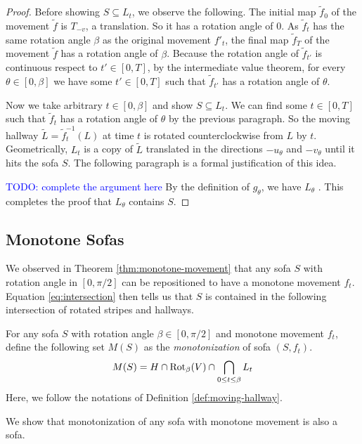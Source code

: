 \begin{proof}
Before showing $S \subseteq L_t$, we observe the following. The initial map $\tilde{f}_0$ of the movement $\tilde{f}$ is
$T_{-v}$, a translation. 
So it has a rotation angle of $0$.
As $\tilde{f}_t$ has the same rotation angle $\beta$ as the original movement $f'_t$, the final map $\tilde{f}_T$ of the movement $\tilde{f}$ has a rotation angle of $\beta$.
Because the rotation angle of $\tilde{f}_{t'}$ is continuous respect to $t' \in [0, T]$,
by the intermediate value theorem, for every $\theta \in [0, \beta]$ we have
some $t' \in [0, T]$ such that $\tilde{f}_{t'}$ has a rotation angle of $\theta$.

Now we take arbitrary $t \in [0, \beta]$ and show $S \subseteq L_t$.
We can find some $t \in [0, T]$ such that $\tilde{f}_t$ has a rotation angle of $\theta$ by the previous paragraph.
So the moving hallway $\tilde{L} = \tilde{f}_t^{-1}(L)$ at time $t$ is rotated counterclockwise from $L$ by $t$.
Geometrically, $L_t$ is a copy of $\tilde{L}$ translated in the directions $-u_\theta$ and $-v_\theta$ until it hits the sofa $S$.
The following paragraph is a formal justification of this idea.

\textcolor{blue}{TODO: complete the argument here}
By the definition of $g_\theta$, we have $L_\theta$
. This completes the proof that $L_\theta$ contains $S$.
\end{proof}

\subsection{Monotone Sofas}

We observed in Theorem \ref{thm:monotone-movement} that any sofa $S$ with rotation angle in $[0, \pi / 2]$ can be repositioned to have a monotone movement $f_t$.
Equation \ref{eq:intersection} then tells us that $S$ is contained in the following intersection of rotated stripes and hallways.
\begin{definition}
\label{def:monotonization}
For any sofa $S$ with rotation angle $\beta \in [0, \pi / 2]$ and monotone movement $f_t$, define the following set $M(S)$ as the \emph{monotonization} of sofa $(S, f_t)$.
\begin{equation}
\label{eq:monotone-sofa}
M(S) = H \cap \operatorname{Rot}_\beta(V) \cap \bigcap_{0 \leq t \leq \beta} L_t
\end{equation}
Here, we follow the notations of Definition \ref{def:moving-hallway}.
\end{definition}
We show that monotonization of any sofa with monotone movement is also a sofa.

